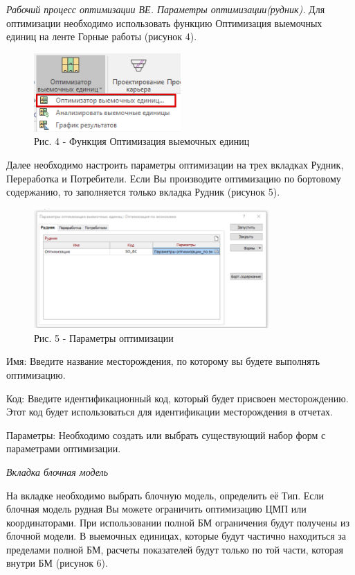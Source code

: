 \emph{Рабочий процесс оптимизации ВЕ. Параметры оптимизации(рудник).}
Для оптимизации необходимо использовать функцию Оптимизация выемочных
единиц на ленте Горные работы (рисунок 4).

\begin{figure}[H]
	\centering
	\includegraphics[width=0.5\textwidth]{assets/1253}
	\caption*{Рис. 4 - Функция Оптимизация выемочных единиц}
\end{figure}

Далее необходимо настроить параметры оптимизации на трех вкладках
Рудник, Переработка и Потребители. Если Вы производите оптимизацию по
бортовому содержанию, то заполняется только вкладка Рудник (рисунок 5).

\begin{figure}[H]
	\centering
	\includegraphics[width=0.8\textwidth]{assets/1254}
	\caption*{Рис. 5 - Параметры оптимизации}
\end{figure}

\begin{multicols}{2}
Имя: Введите название месторождения, по которому вы будете выполнять
оптимизацию.

Код: Введите идентификационный код, который будет присвоен
месторождению. Этот код будет использоваться для идентификации
месторождения в отчетах.

Параметры: Необходимо создать или выбрать существующий набор форм с
параметрами оптимизации.

\emph{Вкладка блочная модель}

На вкладке необходимо выбрать блочную модель, определить её Тип. Если
блочная модель рудная Вы можете ограничить оптимизацию ЦМП или
координаторами. При использовании полной БМ ограничения будут получены
из блочной модели. В выемочных единицах, которые будут частично
находиться за пределами полной БМ, расчеты показателей будут только по
той части, которая внутри БМ (рисунок 6).
\end{multicols}


